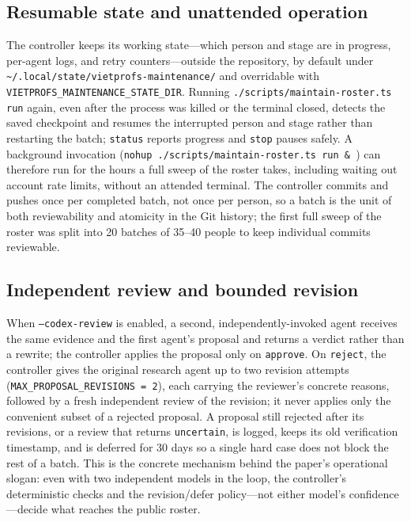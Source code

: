 \documentclass[11pt]{article}
\newcommand{\code}[1]{\texttt{\small #1}}
\begin{document}
\subsection{Resumable state and unattended operation}
The controller keeps its working state---which person and stage are in progress, per-agent logs, and retry counters---outside the repository, by default under \code{\textasciitilde/.local/state/vietprofs-maintenance/} and overridable with \code{VIETPROFS\_MAINTENANCE\_STATE\_DIR}.
Running \code{./scripts/maintain-roster.ts run} again, even after the process was killed or the terminal closed, detects the saved checkpoint and resumes the interrupted person and stage rather than restarting the batch; \code{status} reports progress and \code{stop} pauses safely.
A background invocation (\code{nohup ./scripts/maintain-roster.ts run \& }) can therefore run for the hours a full sweep of the roster takes, including waiting out account rate limits, without an attended terminal.
The controller commits and pushes once per completed batch, not once per person, so a batch is the unit of both reviewability and atomicity in the Git history; the first full sweep of the roster was split into 20 batches of 35--40 people to keep individual commits reviewable.

\subsection{Independent review and bounded revision}
When \code{--codex-review} is enabled, a second, independently-invoked agent receives the same evidence and the first agent's proposal and returns a verdict rather than a rewrite; the controller applies the proposal only on \code{approve}.
On \code{reject}, the controller gives the original research agent up to two revision attempts (\code{MAX\_PROPOSAL\_REVISIONS = 2}), each carrying the reviewer's concrete reasons, followed by a fresh independent review of the revision; it never applies only the convenient subset of a rejected proposal.
A proposal still rejected after its revisions, or a review that returns \code{uncertain}, is logged, keeps its old verification timestamp, and is deferred for 30 days so a single hard case does not block the rest of a batch.
This is the concrete mechanism behind the paper's operational slogan: even with two independent models in the loop, the controller's deterministic checks and the revision/defer policy---not either model's confidence---decide what reaches the public roster.
\end{document}
